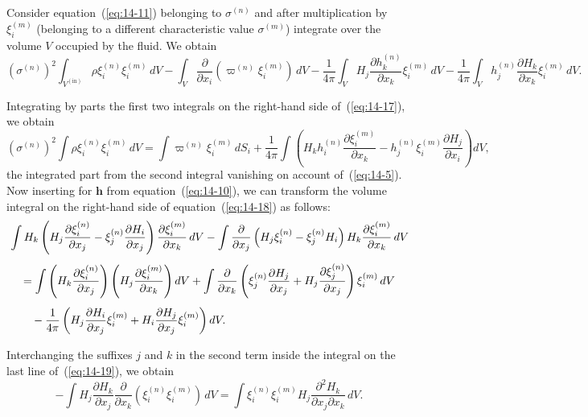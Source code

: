 Consider equation~(\ref{eq:14-11}) belonging to $\sigma^{(n)}$ and after multiplication by $\xi_i^{(m)}$ (belonging to a different characteristic value $\sigma^{(m)}$) integrate over the volume $V$ occupied by the fluid. We obtain
\begin{equation}
\label{eq:14-17}
(\sigma^{(n)})^2 \int_{V^{(\mathrm{in})}} \rho \xi_i^{(n)} \xi_i^{(m)} \, dV - \int_V \frac{\partial}{\partial x_i} (\varpi^{(n)} \xi_i^{(m)}) \, dV - \frac{1}{4\pi} \int_V H_j \frac{\partial h_k^{(n)}}{\partial x_k} \xi_i^{(m)} \, dV - \frac{1}{4\pi} \int_V h_j^{(n)} \frac{\partial H_k}{\partial x_k} \xi_i^{(m)} \, dV.
\end{equation}

Integrating by parts the first two integrals on the right-hand side of~(\ref{eq:14-17}), we obtain
\begin{equation}
\label{eq:14-18}
(\sigma^{(n)})^2 \int \rho \xi_i^{(n)} \xi_i^{(m)} \, dV = \int \varpi^{(n)} \xi_i^{(m)} \, dS_i + \frac{1}{4\pi} \int \left( H_k h_i^{(n)} \frac{\partial \xi_i^{(m)}}{\partial x_k} - h_j^{(n)} \xi_i^{(m)} \frac{\partial H_j}{\partial x_i} \right) dV,
\end{equation}
the integrated part from the second integral vanishing on account of~(\ref{eq:14-5}). Now inserting for $\mathbf{h}$ from equation~(\ref{eq:14-10}), we can transform the volume integral on the right-hand side of equation~(\ref{eq:14-18}) as follows:
\begin{align}
\label{eq:14-19}
& \int H_k \left(H_j \frac{\partial \xi_i^{(n)}}{\partial x_j} - \xi_j^{(n)} \frac{\partial H_i}{\partial x_j}\right) \frac{\partial \xi_i^{(m)}}{\partial x_k} \, dV - \int \frac{\partial}{\partial x_j}\left(H_j \xi_i^{(n)} - \xi_j^{(n)} H_i\right) H_k \frac{\partial \xi_i^{(m)}}{\partial x_k} \, dV \notag \\[4pt]
& \quad = \int \left(H_k \frac{\partial \xi_i^{(n)}}{\partial x_j}\right) \left(H_j \frac{\partial \xi_i^{(m)}}{\partial x_k}\right) dV + \int \frac{\partial}{\partial x_k} \left(\xi_j^{(n)} \frac{\partial H_j}{\partial x_j} + H_j \frac{\partial \xi_j^{(n)}}{\partial x_j}\right) \xi_i^{(m)} \, dV \notag \\[4pt]
& \qquad - \frac{1}{4\pi} \left( H_j \frac{\partial H_i}{\partial x_j} \xi_i^{(m)} + H_i \frac{\partial H_j}{\partial x_j} \xi_i^{(m)} \right) dV.
\end{align}

Interchanging the suffixes $j$ and $k$ in the second term inside the integral on the last line of~(\ref{eq:14-19}), we obtain
\begin{equation}
\label{eq:14-20}
-\int H_j \frac{\partial H_k}{\partial x_j} \frac{\partial}{\partial x_k} (\xi_i^{(n)} \xi_i^{(m)}) \, dV = \int \xi_i^{(n)} \xi_i^{(m)} H_j \frac{\partial^2 H_k}{\partial x_j \partial x_k} \, dV.
\end{equation}

